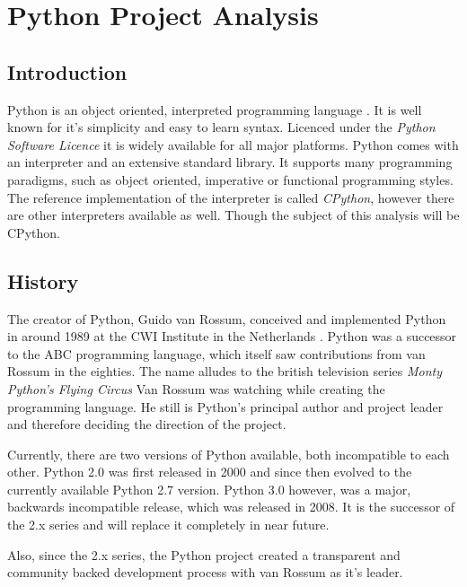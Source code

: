 \section{Python Project Analysis} %
\label{sec:Python Project Analysis}

\subsection{Introduction} %
\label{sub:Introduction}


Python is an object oriented, interpreted programming language
\cite{PythonAbout}. It is well known for it's simplicity and easy to learn
syntax. Licenced under the \emph{Python Software Licence} \cite{PythonLicence}
it is widely available for all major platforms. Python comes with an
interpreter and an extensive standard library. It supports many programming
paradigms, such as object oriented, imperative or functional programming
styles. The reference implementation of the interpreter is called
\emph{CPython}, however there are other interpreters available as well. Though
the subject of this analysis will be CPython.


\subsection{History} %
\label{sub:History}

The creator of Python, Guido van Rossum, conceived and implemented Python in
around 1989 at the CWI Institute in the Netherlands \cite{Venners2003}. Python
was a successor to the ABC programming language, which itself saw contributions
from van Rossum in the eighties. The name alludes to the british television
series \emph{Monty Python's Flying Circus} Van Rossum was watching while
creating the programming language. He still is Python's principal author and
project leader and therefore deciding the direction of the project.

Currently, there are two versions of Python available, both incompatible to
each other. Python 2.0 was first released in 2000 and since then evolved to the
currently available Python 2.7 version. Python 3.0 however, was a major,
backwards incompatible release, which was released in 2008. It is the successor
of the 2.x series and will replace it completely in near future.

Also, since the 2.x series, the Python project created a transparent and
community backed development process with van Rossum as it's leader.

